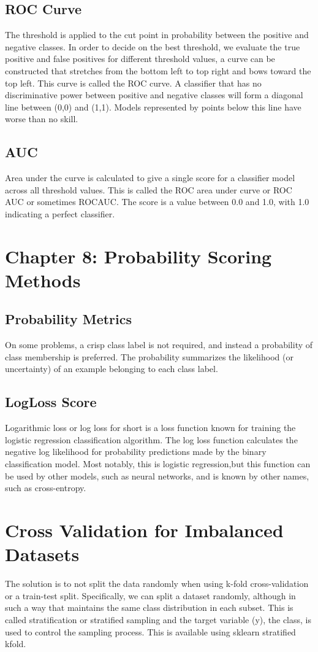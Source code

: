 \documentclass{article}
\begin{document}
\subsection{ROC Curve}
The threshold is applied to the cut point in probability between the positive and negative classes. In order to decide on the best threshold, we evaluate the true positive and false positives for different threshold values, a curve can be constructed that stretches from the bottom left to top right and bows toward the top left. This curve is called the ROC curve. A classifier that has no discriminative power between positive and negative classes will form a diagonal line between (0,0) and (1,1). Models represented by points below this line have worse than no skill.
\subsection{AUC}
Area under the curve is calculated to give a single score for a classifier model across all threshold values. This is called the ROC area under curve or ROC AUC or sometimes ROCAUC. The score is a value between 0.0 and 1.0, with 1.0 indicating a perfect classifier.
\section{Chapter 8: Probability Scoring Methods}
\subsection{Probability Metrics}
On some problems, a crisp class label is not required, and instead a probability of class membership is preferred. The probability summarizes the likelihood (or uncertainty) of an example belonging to each class label. 
\subsection{LogLoss Score}
Logarithmic loss or log loss for short is a loss function known for training the logistic regression classification algorithm. The log loss function calculates the negative log likelihood for probability predictions made by the binary classification model. Most notably, this is logistic regression,but this function can be used by other models, such as neural networks, and is known by other names, such as cross-entropy.
\section{Cross Validation for Imbalanced Datasets}
The solution is to not split the data randomly when using k-fold cross-validation or a train-test split. Specifically, we can split a dataset randomly, although in such a way that maintains the same class distribution in each subset. This is called stratification or stratified sampling and the target variable (y), the class, is used to control the sampling process. This is available using sklearn stratified kfold.
\end{document}
